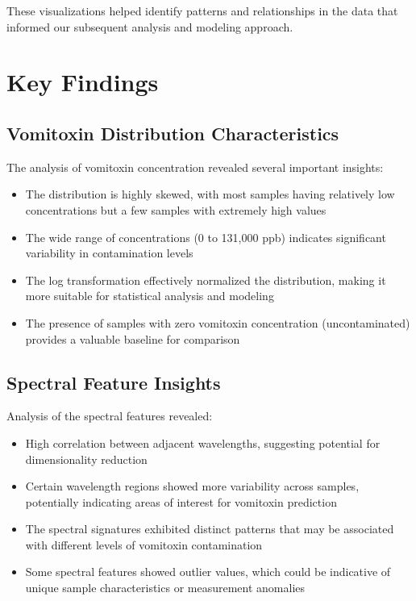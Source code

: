 \documentclass[12pt,a4paper]{article}
\begin{document}
These visualizations helped identify patterns and relationships in the data that informed our subsequent analysis and modeling approach.

\section{Key Findings}

\subsection{Vomitoxin Distribution Characteristics}

The analysis of vomitoxin concentration revealed several important insights:

\begin{itemize}
    \item The distribution is highly skewed, with most samples having relatively low concentrations but a few samples with extremely high values
    \item The wide range of concentrations (0 to 131,000 ppb) indicates significant variability in contamination levels
    \item The log transformation effectively normalized the distribution, making it more suitable for statistical analysis and modeling
    \item The presence of samples with zero vomitoxin concentration (uncontaminated) provides a valuable baseline for comparison
\end{itemize}

\subsection{Spectral Feature Insights}

Analysis of the spectral features revealed:

\begin{itemize}
    \item High correlation between adjacent wavelengths, suggesting potential for dimensionality reduction
    \item Certain wavelength regions showed more variability across samples, potentially indicating areas of interest for vomitoxin prediction
    \item The spectral signatures exhibited distinct patterns that may be associated with different levels of vomitoxin contamination
    \item Some spectral features showed outlier values, which could be indicative of unique sample characteristics or measurement anomalies
\end{itemize}
\end{document}
